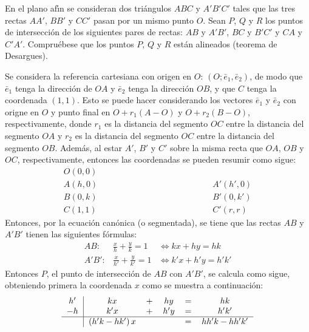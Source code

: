 \begin{enunciado}
 En el plano af\'{\i}n se consideran dos tri\'angulos $ABC$ y $A'B'C'$
 tales que las tres rectas $AA'$, $BB'$ y $CC'$ pasan por un mismo punto
 $O$.
 Sean $P$, $Q$ y $R$ los puntos de intersecci\'on
 de los siguientes pares de rectas:
 $AB$ y $A'B'$, $BC$ y $B'C'$ y $CA$ y $C'A'$.
 Compru\'ebese que los puntos $P$, $Q$ y $R$ est\'an alineados
 (teorema de Desargues).
\end{enunciado}

\begin{solucion}
 Se considera la referencia cartesiana con origen en $O$:
 $(O;\bar{e}_1,\bar{e}_2)$, de modo que $\bar{e}_1$ tenga la direcci\'on
 de $OA$ y $\bar{e}_2$ tenga la direcci\'on $OB$,
 y que $C$ tenga la coordenada $(1,1)$.
 Esto se puede hacer considerando los vectores $\bar{e}_1$ y $\bar{e}_2$
 con origne en $O$ y punto final en $O+r_1(A-O)$ y $O+r_2(B-O)$,
 respectivamente, donde $r_1$ es la distancia del segmento $OC$
 entre la distancia del segmento $OA$
 y $r_2$ es la distancia del segmento $OC$
 entre la distancia del segmento $OB$.
 Adem\'as, al estar $A'$, $B'$ y $C'$ sobre la misma recta
 que $OA$, $OB$ y $OC$, respectivamente,
 entonces las coordenadas se pueden resumir como sigue:
 \begin{eqnarray*}
  O(0,0) & \hspace{5cm} & \\
  A(h,0) & & A'(h',0) \\
  B(0,k) & & B'(0,k') \\
  C(1,1) & & C'(r,r)
 \end{eqnarray*}
 Entonces, por la ecuaci\'on can\'onica (o segmentada),
 se tiene que las rectas $AB$ y $A'B'$ tienen las siguientes f\'ormulas:
 \begin{eqnarray*}
  AB: & \frac{x}{h} + \frac{y}{k} = 1 & \Leftrightarrow kx+hy = hk \\
  A'B': & \frac{x}{h'} + \frac{y}{k'} = 1 & \Leftrightarrow k'x+h'y = h'k'
 \end{eqnarray*}
 Entonces $P$, el punto de intersecci\'on de $AB$ con $A'B'$, se calcula
 como sigue,
 obteniendo primera la coordenada $x$ como se muestra a continuaci\'on:
 \begin{eqnarray*}
  \begin{tabular}{c|ccccc}
   $h'$ & $kx$  & $+$ & $hy$  & $=$ & $hk$   \\
   $-h$ & $k'x$ & $+$ & $h'y$ & $=$ & $h'k'$ \\
   \hline 
   & $\left(h'k-hk'\right)x$ & & & $=$ & $hh'k-hh'k'$

\end{tabular}
\end{eqnarray*}
\end{solucion}
